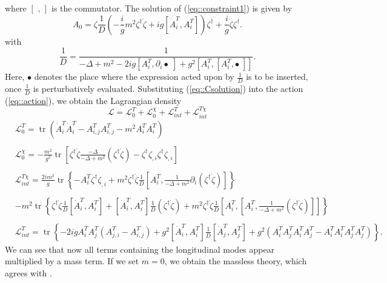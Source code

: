 \documentclass{article}
\DeclareMathOperator{\tr}{tr}
\begin{document}
where $\left[\,\,,\,\right]$ is the commutator. The solution of (\ref{eq::constraint1}) is given by 
\begin{equation}\label{eq::Csolution}
    A_0=\zeta\frac{1}{D}\left(-\frac{i}{g}m^2\zeta^{\dagger}\dot{\zeta}+ig\left[\dot{A}_i^T,A_i^T\right]\right)\zeta^{\dagger}+\frac{i}{g}\dot{\zeta}\zeta^{\dagger}.
\end{equation}
with
\begin{equation}
    \frac{1}{D}=\frac{1}{-\Delta+m^2-2ig[A_i^T,\partial_i\bullet\;]+g^2[A_i^T,[A_i^T,\bullet\;]]}.
\end{equation}
Here, $\bullet$ denotes the place where the expression acted upon by $\frac{1}{D}$ is to be inserted, once $\frac{1}{D}$ is perturbatively evaluated. Substituting (\ref{eq::Csolution}) into the action (\ref{eq::action}), we obtain the Lagrangian density
\begin{equation}\label{eq::nonpertLagrangian}
    \mathcal{L}=\mathcal{L}^T_0+\mathcal{L}_0^{\chi}+\mathcal{L}^T_{int}+\mathcal{L}^{T\chi}_{int}
\end{equation}
\begin{equation*}
    \begin{split}
        &\mathcal{L}^T_0=\tr\left(\dot{A}_i^T\dot{A}_i^T-A_{i,j}^TA_{i,j}^T-m^2A_i^TA_i^T\right)\\\\
        &\mathcal{L}_0^{\chi}=-\frac{m^2}{g^2}\tr\left[\zeta^{\dagger}\dot{\zeta}\frac{-\Delta}{-\Delta+m^2}\left(\zeta^{\dagger}\dot{\zeta}\right)-\zeta^{\dagger}\zeta_{,i}\zeta^{\dagger}\zeta_{,i}\right]\\\\
        & \mathcal{L}^{T\chi}_{int}=\frac{2im^2}{g}\tr\left\{-A_i^T\zeta^{\dagger}\zeta_{,i}+m^2\zeta^{\dagger}\dot{\zeta}\frac{1}{D}\left[A_i^T,\frac{1}{-\Delta+m^2}\partial_i(\zeta^{\dagger}\dot{\zeta})\right]\right\}\\\\
        &-m^2\tr\left\{\zeta^{\dagger}\dot{\zeta}\frac{1}{D}[\dot{A}_i^T,A_i^T]+[\dot{A}_i^T,A_i^T]\frac{1}{D}(\zeta^{\dagger}\dot{\zeta})+m^2\zeta^{\dagger}\dot{\zeta}\frac{1}{D}\left[A_i^T,\left[A_i^T,\frac{1}{-\Delta+m^2}(\zeta^{\dagger}\dot{\zeta})\right]\right]\right\}\\\\
        &\mathcal{L}^T_{int}=\tr\left\{-2igA_i^TA_j^T\left(A_{j,i}^T-A_{i,j}^T\right)+g^2\left[\dot{A}_i^T,A_i^T\right]\frac{1}{D}\left[\dot{A}_j^T,A_j^T\right]+g^2\left(A_i^TA_j^TA_i^TA_j^T-A_i^TA_i^TA_j^TA_j^T\right)\right\}.
    \end{split}
\end{equation*}
We can see that now all terms containing the longitudinal modes appear multiplied by a mass term. If we set $m=0$, we obtain the massless theory, which agrees with \cite{Vainshtein}. 
\end{document}
